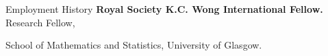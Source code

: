 \begin{rubric}{Employment History}
%
%
\entry*[2026 -- 2028]%
	\textbf{Royal Society K.C. Wong International Fellow.} 
	Research Fellow,\par 
	School of Mathematics and Statistics,
	University of Glasgow.
%
\end{rubric}